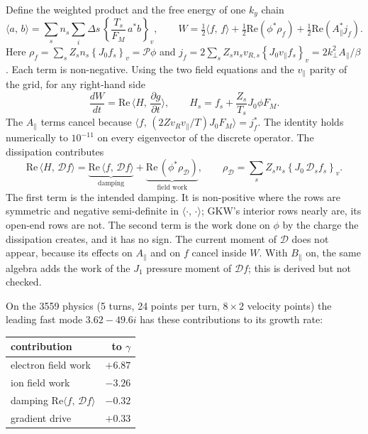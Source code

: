 \documentclass[10pt,a4paper]{article}
\newcommand{\ip}[2]{\langle #1,\,#2\rangle}
\newcommand{\vint}[1]{\left\{#1\right\}_v}
\begin{document}
Define the weighted product and the free energy of one $k_y$ chain
\begin{equation}
\ip{a}{b} = \sum_s n_s \sum_{i} \Delta s\, \vint{\frac{T_s}{F_M}\, a^* b}, \qquad
W = \tfrac12\ip{f}{f} + \tfrac12 \mathrm{Re}(\phi^* \rho_f) + \tfrac12\mathrm{Re}(A_\parallel^* j_f).
\end{equation}
Here $\rho_f = \sum_s Z_s n_s \vint{J_0 f_s} = \mathcal P\phi$ and $j_f = 2\sum_s Z_s n_s v_{R,s}\vint{J_0 v_\parallel f_s} = 2k_\perp^2 A_\parallel/\beta$. Each term is non-negative. Using the two field equations and the $v_\parallel$ parity of the grid, for any right-hand side
\begin{equation}
\frac{dW}{dt} = \mathrm{Re}\,\ip{H}{\frac{\partial g}{\partial t}}, \qquad H_s = f_s + \frac{Z_s}{T_s} J_0 \phi F_M .
\end{equation}
The $A_\parallel$ terms cancel because $\ip{f}{(2Z v_R v_\parallel/T) J_0 F_M} = j_f^*$. The identity holds numerically to $10^{-11}$ on every eigenvector of the discrete operator. The dissipation contributes
\begin{equation}
\mathrm{Re}\,\ip{H}{\mathcal D f} = \underbrace{\mathrm{Re}\,\ip{f}{\mathcal D f}}_{\text{damping}} + \underbrace{\mathrm{Re}\,(\phi^* \rho_{\mathcal D})}_{\text{field work}}, \qquad
\rho_{\mathcal D} = \sum_s Z_s n_s \vint{J_0\, \mathcal D_s f_s}.
\label{eq:split}
\end{equation}
The first term is the intended damping. It is non-positive where the rows are symmetric and negative semi-definite in $\ip{\cdot}{\cdot}$; GKW's interior rows nearly are, its open-end rows are not. The second term is the work done on $\phi$ by the charge the dissipation creates, and it has no sign. The current moment of $\mathcal D$ does not appear, because its effects on $A_\parallel$ and on $f$ cancel inside $W$. With $B_\parallel$ on, the same algebra adds the work of the $J_1$ pressure moment of $\mathcal D f$; this is derived but not checked.

On the 3559 physics (5 turns, 24 points per turn, $8\times2$ velocity points) the leading fast mode $3.62 - 49.6i$ has these contributions to its growth rate:

\begin{center}\small
\begin{tabular}{lr}
\toprule
contribution & to $\gamma$ \\
\midrule
electron field work & $+6.87$ \\
ion field work & $-3.26$ \\
damping $\mathrm{Re}\ip{f}{\mathcal D f}$ & $-0.32$ \\
gradient drive & $+0.33$ \\
\bottomrule
\end{tabular}
\end{center}
\end{document}
